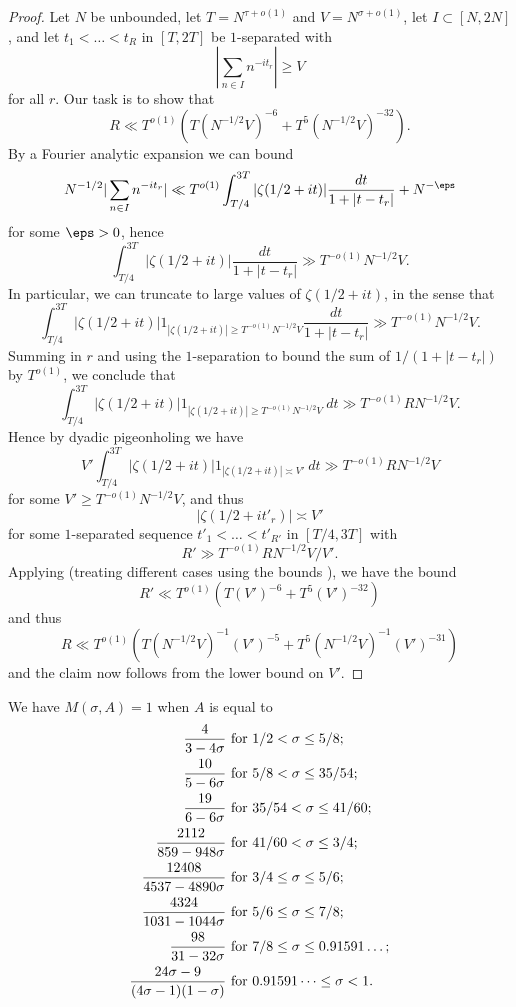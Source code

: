 \begin{proof} Let $N$ be unbounded, let $T = N^{\tau+o(1)}$ and $V = N^{\sigma+o(1)}$, let $I \subset [N,2N]$, and let $t_1 < \dots < t_R$ in $[T,2T]$ be $1$-separated with
$$ |\sum_{n \in I} n^{-it_r}| \geq V$$
for all $r$.  Our task is to show that
$$ R \ll T^{o(1)} ( T (N^{-1/2} V)^{-6} + T^5 (N^{-1/2} V)^{-32}).$$
By a Fourier analytic expansion we can bound
$$ N^{-1/2} |\sum_{n \in I} n^{-it_r}| \ll T^{o(1)} \int_{T/4}^{3T} |\zeta(1/2+it)| \frac{dt}{1+|t-t_r|} + N^{-\eps}$$
for some $\eps>0$, hence
$$ \int_{T/4}^{3T} |\zeta(1/2+it)| \frac{dt}{1+|t-t_r|} \gg T^{-o(1)} N^{-1/2} V.$$
In particular, we can truncate to large values of $\zeta(1/2+it)$, in the sense that
$$ \int_{T/4}^{3T} |\zeta(1/2+it)| 1_{|\zeta(1/2+it)| \geq T^{-o(1)} N^{-1/2} V} \frac{dt}{1+|t-t_r|} \gg T^{-o(1)} N^{-1/2} V.$$
Summing in $r$ and using the $1$-separation to bound the sum of $1/(1+|t-t_r|)$ by $T^{o(1)}$, we conclude that
$$ \int_{T/4}^{3T} |\zeta(1/2+it)| 1_{|\zeta(1/2+it)| \geq T^{-o(1)} N^{-1/2} V} \ dt \gg T^{-o(1)} R N^{-1/2} V.$$
Hence by dyadic pigeonholing we have
$$ V' \int_{T/4}^{3T} |\zeta(1/2+it)| 1_{|\zeta(1/2+it)| \asymp V'} \ dt \gg T^{-o(1)} R N^{-1/2} V$$
for some $V' \geq T^{-o(1)} N^{-1/2} V$, and thus
$$ |\zeta(1/2+it'_r)| \asymp V'$$
for some $1$-separated sequence $t'_1 < \dots < t'_{R'}$ in $[T/4, 3T]$ with
$$ R' \gg T^{-o(1)} R N^{-1/2} V / V'.$$
Applying \cite[Theorem 2]{heathbrown_twelfth_1978} (treating different cases using the bounds \cite[(7), (8), (9)]{heathbrown_twelfth_1978}), we have the bound
$$ R' \ll T^{o(1)} ( T (V')^{-6} + T^5 (V')^{-32})$$
and thus
$$ R \ll T^{o(1)} ( T (N^{-1/2} V)^{-1} (V')^{-5} + T^5 (N^{-1/2} V)^{-1} (V')^{-31})$$
and the claim now follows from the lower bound on $V'$. 
\end{proof}

\begin{lemma}\cite[Theorem 8.4]{ivic}  We have $M(\sigma,A) = 1$ when $A$ is equal to
\begin{align*}
    \frac{4}{3-4\sigma} & \hbox{ for } 1/2 < \sigma \leq 5/8; \\
    \frac{10}{5-6\sigma} & \hbox{ for } 5/8 < \sigma \leq 35/54; \\
    \frac{19}{6-6\sigma} & \hbox{ for } 35/54 < \sigma \leq 41/60; \\
    \frac{2112}{859-948\sigma} & \hbox{ for } 41/60 < \sigma \leq 3/4;\\
    \frac{12408}{4537-4890\sigma} & \hbox{ for } 3/4 \leq \sigma \leq 5/6; \\
    \frac{4324}{1031-1044\sigma} & \hbox{ for } 5/6 \leq \sigma \leq 7/8; \\
    \frac{98}{31-32\sigma} & \hbox{ for } 7/8 \leq \sigma \leq 0.91591\dots; \\
    \frac{24\sigma-9}{(4\sigma-1)(1-\sigma)} & \hbox{ for } 0.91591\dots \leq \sigma < 1. 
\end{align*}
\end{lemma}

